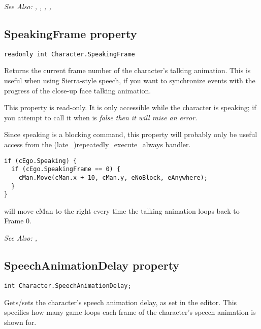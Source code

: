 \it{See Also:} ,
,
,
,


\subsection{SpeakingFrame property}\label{Character.SpeakingFrame}%

\begin{verbatim}
readonly int Character.SpeakingFrame
\end{verbatim}
Returns the current frame number of the character's talking animation. This is
useful when using Sierra-style speech, if you want to synchronize events with the
progress of the close-up face talking animation.

This property is read-only. It is only accessible while the character is speaking;
if you attempt to call it when  is
\it{false} then it will raise an error.

Since speaking is a blocking command, this property will probably only be useful
access from the (late_)repeatedly_execute_always handler.

\begin{verbatim}
if (cEgo.Speaking) {
  if (cEgo.SpeakingFrame == 0) {
    cMan.Move(cMan.x + 10, cMan.y, eNoBlock, eAnywhere);
  }
}
\end{verbatim}
will move cMan to the right every time the talking animation loops back to Frame 0.

\it{See Also:} ,


\subsection{SpeechAnimationDelay property}\label{Character.SpeechAnimationDelay}%

\begin{verbatim}
int Character.SpeechAnimationDelay;
\end{verbatim}

Gets/sets the character's speech animation delay, as set in the editor. This specifies
how many game loops each frame of the character's speech animation is shown for.

